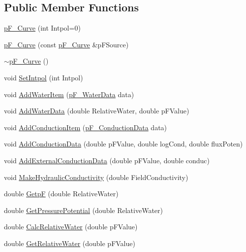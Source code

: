 \subsection*{Public Member Functions}
\begin{DoxyCompactItemize}
\item 
\hyperlink{classp_f___curve_a08f8e5a9dbf7d29e0413501fa695a8bf}{pF\_\-Curve} (int Intpol=0)
\item 
\hyperlink{classp_f___curve_a563d797aa0fddb481ae44b8dffcc4283}{pF\_\-Curve} (const \hyperlink{classp_f___curve}{pF\_\-Curve} \&pFSource)
\item 
\hyperlink{classp_f___curve_a9a3addfa27190e8e5d00659ed79dc942}{$\sim$pF\_\-Curve} ()
\item 
void \hyperlink{classp_f___curve_a30876c763a84fb1b368b9199dd3bfe4e}{SetIntpol} (int Intpol)
\item 
void \hyperlink{classp_f___curve_afc0b0af6cf40637e3d7c3320a9e0408c}{AddWaterItem} (\hyperlink{structp_f___water_data}{pF\_\-WaterData} data)
\item 
void \hyperlink{classp_f___curve_a32475e71de9e84e7e565d2d2244bf062}{AddWaterData} (double RelativeWater, double pFValue)
\item 
void \hyperlink{classp_f___curve_aade09d8adedcc05c408e8410364d9132}{AddConductionItem} (\hyperlink{structp_f___conduction_data}{pF\_\-ConductionData} data)
\item 
void \hyperlink{classp_f___curve_a64d50a0166931ab3390514d037f20c04}{AddConductionData} (double pFValue, double logCond, double fluxPoten)
\item 
void \hyperlink{classp_f___curve_a85d921adde495b6e6bcb0ccab79739be}{AddExternalConductionData} (double pFValue, double conduc)
\item 
void \hyperlink{classp_f___curve_adc14b985f54ce11c4955b319f1428f3e}{MakeHydraulicConductivity} (double FieldConductivity)
\item 
double \hyperlink{classp_f___curve_a6989350998b7c15af4fd59055ee20676}{GetpF} (double RelativeWater)
\item 
double \hyperlink{classp_f___curve_a816b70830f88edec58e42d94dee0b254}{GetPressurePotential} (double RelativeWater)
\item 
double \hyperlink{classp_f___curve_a574df17f0a69cf55b6b6de58bec3d006}{CalcRelativeWater} (double pFValue)
\item 
double \hyperlink{classp_f___curve_a662cff8287e3a413961df635acef65b7}{GetRelativeWater} (double pFValue)
\item 

\end{DoxyCompactItemize}
